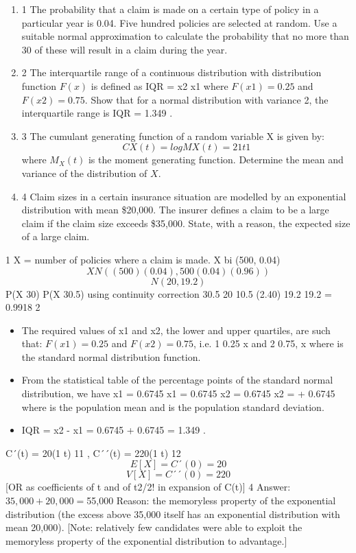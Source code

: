 \documentclass[a4paper,12pt]{article}
\begin{document}
\begin{enumerate}
\item
1 The probability that a claim is made on a certain type of policy in a particular year is
0.04. Five hundred policies are selected at random.
Use a suitable normal approximation to calculate the probability that no more than 30
of these will result in a claim during the year. 
\item 2 The interquartile range of a continuous distribution with distribution function $F(x)$ is
defined as IQR = x2 x1 where $F(x1) = 0.25$ and $F(x2) = 0.75$.
Show that for a normal distribution with variance 2, the interquartile range is
IQR = 1.349 . 
\item 3 The cumulant generating function of a random variable X is given by:
 \[CX (t) = logMX (t) = 2 1 t 1\]
where $M_X(t)$ is the moment generating function.
Determine the mean and variance of the distribution of $X$. 
\item 4 Claim sizes in a certain insurance situation are modelled by an exponential
distribution with mean \$20,000. The insurer defines a claim to be a large claim if the
claim size exceeds \$35,000.
State, with a reason, the expected size of a large claim. 
\end{enumerate}
\newpage

1 X = number of policies where a claim is made.
X bi (500, 0.04)
\[X N((500)(0.04), 500(0.04)(0.96))\] \[N(20, 19.2)\]
P(X 30) P(X 30.5) using continuity correction
30.5 20 10.5
(2.40)
19.2 19.2
= 0.9918
2 
\begin{itemize}
    \item The required values of x1 and x2, the lower and upper quartiles, are such that:
$F(x1) = 0.25$ and $F(x2) = 0.75$,
i.e. 1 0.25
x
and 2 0.75,
x
where is the standard normal distribution function.
\item From the statistical table of the percentage points of the standard normal distribution,
we have
x1
= 0.6745 x1 = 0.6745
x2
= 0.6745 x2 = + 0.6745
where is the population mean and is the population standard deviation.
\item IQR = x2 - x1
= 0.6745 + 0.6745
= 1.349 .
\end{itemize}
 C´(t) = 20(1 t) 11 , C´´(t) = 220(1 t) 12
\[E[X] = C´(0) = 20\]
\[V[X] = C´´(0) = 220\]
[OR as coefficients of t and of t2/2! in expansion of C(t)]
4 Answer: $35,000 + 20,000 = $55,000
Reason: the memoryless property of the exponential distribution (the excess above
35,000 itself has an exponential distribution with mean 20,000).
[Note: relatively few candidates were able to exploit the memoryless property of the
exponential distribution to advantage.]
\end{document}
